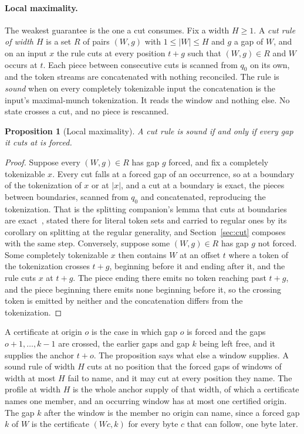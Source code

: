 \documentclass[11pt,a4paper]{article}
\theoremstyle{definition}
\theoremstyle{plain}
\newtheorem{proposition}{Proposition}
\begin{document}
\paragraph{Local maximality.} The weakest guarantee is the one a cut consumes. Fix a width $H \geq 1$. A
\emph{cut rule of width $H$} is a set $R$ of pairs $(W, g)$ with $1 \leq |W| \leq H$ and $g$ a gap of $W$, and on an
input $x$ the rule cuts at every position $t + g$ such that $(W, g) \in R$ and $W$ occurs at $t$. Each piece between
consecutive cuts is scanned from $q_0$ on its own, and the token streams are concatenated with nothing reconciled. The
rule is \emph{sound} when on every completely tokenizable input the concatenation is the input's maximal-munch
tokenization. It reads the window and nothing else. No state crosses a cut, and no piece is rescanned.

\begin{proposition}[Local maximality]
\label{prop:maximal}
A cut rule is sound if and only if every gap it cuts at is forced.
\end{proposition}

\begin{proof}
Suppose every $(W, g) \in R$ has gap $g$ forced, and fix a completely tokenizable $x$. Every cut falls at a forced gap
of an occurrence, so at a boundary of the tokenization of $x$ or at $|x|$, and a cut at a boundary is exact, the pieces
between boundaries, scanned from $q_0$ and concatenated, reproducing the tokenization. That is the splitting companion's
lemma that cuts at boundaries are exact~\cite{nidhogg2026splitting}, stated there for literal token sets and carried to
regular ones by its corollary on splitting at the regular generality, and Section~\ref{sec:cut} composes with the same
step. Conversely, suppose some $(W, g) \in R$ has gap $g$ not forced. Some completely tokenizable $x$ then contains $W$
at an offset $t$ where a token of the tokenization crosses $t + g$, beginning before it and ending after it, and the
rule cuts $x$ at $t + g$. The piece ending there emits no token reaching past $t + g$, and the piece beginning there
emits none beginning before it, so the crossing token is emitted by neither and the concatenation differs from the
tokenization.
\end{proof}

A certificate at origin $o$ is the case in which gap $o$ is forced and the gaps $o + 1, \ldots, k - 1$ are crossed, the
earlier gaps and gap $k$ being left free, and it supplies the anchor $t + o$. The proposition says what else a window
supplies. A sound rule of width $H$ cuts at no position that the forced gaps of windows of width at most $H$ fail to
name, and it may cut at every position they name. The profile at width $H$ is the whole anchor supply of that width, of
which a certificate names one member, and an occurring window has at most one certified origin. The gap $k$ after the
window is the member no origin can name, since a forced gap $k$ of $W$ is the certificate $(Wc, k)$ for every byte $c$
that can follow, one byte later.
\end{document}
